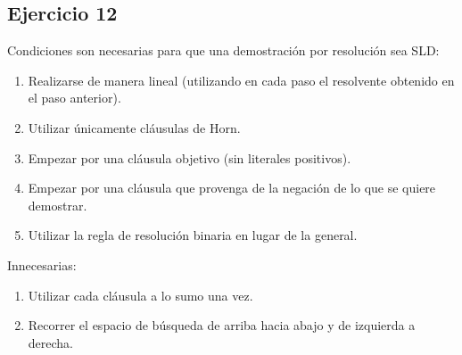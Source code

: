 \documentclass[10pt,a4paper]{article}
\begin{document}
\subsection{Ejercicio 12}
    Condiciones son necesarias para que una demostración por resolución sea SLD:
    \begin{enumerate}
        \item Realizarse de manera lineal (utilizando en cada paso el resolvente obtenido en el paso anterior).
        \item Utilizar únicamente cláusulas de Horn.
        \item Empezar por una cláusula objetivo (sin literales positivos).
        \item Empezar por una cláusula que provenga de la negación de lo que se quiere demostrar.
        \item Utilizar la regla de resolución binaria en lugar de la general.
    \end{enumerate}
    Innecesarias:
    \begin{enumerate}
        \item Utilizar cada cláusula a lo sumo una vez.
        \item Recorrer el espacio de búsqueda de arriba hacia abajo y de izquierda a derecha.
    \end{enumerate}
\end{document}

